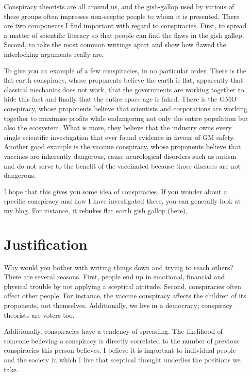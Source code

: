 \begin{multicols}{2}
Conspiracy theorists are all around us, and the gish-gallop used by various of these groups often impresses non-sceptic people to whom it is presented.
There are two components I find important with regard to conspiracies. First, to spread a matter of scientific literacy so that people can find the
flaws in the gish gallop. Second, to take the most common writings apart and show how flawed the interlocking arguments really are.


To give you an example of a few conspiracies, in no particular order. There is the flat earth conspiracy, whose proponents believe the earth is flat,
apparently that classical mechanics does not work, that the governments are working together to hide this fact and finally that the entire space age
is faked. There is the GMO conspiracy, whose proponents believe that scientists and corporations are working together to maximise profits while endangering
not only the entire population but also the ecosystem. What is more, they believe that the industry owns every single scientific investigation that
ever found evidence in favour of GM safety. Another good example is the vaccine conspiracy, whose proponents believe that vaccines are inherently dangerous,
cause neurological disorders such as autism and do not serve to the benefit of the vaccinated because those diseases are not dangerous.


I hope that this gives you some idea of conspiracies. If you wonder about a specific conspiracy and how I have investigated these, you can generally
look at my blog. For instance, it rebukes flat earth gish gallop (\href{http://blog.daimonie.com/2015/11/200-reasons-why-flat-earthers-are.html}{here}),


\section{Justification}

Why would you bother with writing things down and trying to reach others? There are several reasons. First, people end up in emotional, financial
and physical trouble by not applying a sceptical attitude. Second, conspiracies often affect other people. For instance, the vaccine conspiracy
affects the children of its proponents, not themselves. Additionally, we live in a democracy; conspiracy theorists are voters too.


Additionally, conspiracies have a tendency of spreading. The likelihood of someone believing a conspiracy is directly correlated to the number of
previous conspiracies this person believes. I believe it is important to individual people and the society in which I live that sceptical thought
underlies the positions we take. 
	


\end{multicols}
